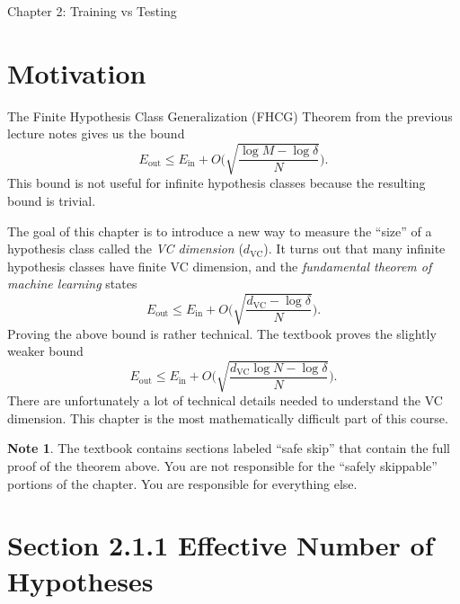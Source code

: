 \documentclass[10pt]{exam}
\theoremstyle{definition}
\newtheorem{note}{Note}
\newcommand{\Ein}{E_{\text{in}}}
\newcommand{\Eout}{E_{\text{out}}}
\newcommand{\dvc}{{d_{\text{VC}}}}
\begin{document}
\begin{center}
{
\Huge
Chapter 2: Training vs Testing
}
\end{center}

\begin{center}
\end{center}

\section*{Motivation}

The Finite Hypothesis Class Generalization (FHCG) Theorem from the previous lecture notes gives us the bound
\begin{equation}
    \Eout \le \Ein + O\bigg(\sqrt{\frac{\log M - \log\delta}{N}}\bigg)
    .
\end{equation}
This bound is not useful for infinite hypothesis classes because the resulting bound is trivial.

The goal of this chapter is to introduce a new way to measure the ``size'' of a hypothesis class called the \emph{VC dimension} ($\dvc$).
It turns out that many infinite hypothesis classes have finite VC dimension,
and the \emph{fundamental theorem of machine learning} states
\begin{equation}
    \Eout \le \Ein + O\bigg(\sqrt{\frac{\dvc - \log\delta}{N}}\bigg)
    .
\end{equation}
Proving the above bound is rather technical.
The textbook proves the slightly weaker bound
\begin{equation}
    \Eout \le \Ein + O\bigg(\sqrt{\frac{\dvc\log N - \log\delta}{N}}\bigg)
    .
\end{equation}
There are unfortunately a lot of technical details needed to understand the VC dimension.
This chapter is the most mathematically difficult part of this course.

\begin{note}
The textbook contains sections labeled ``safe skip'' that contain the full proof of the theorem above.
You are not responsible for the ``safely skippable'' portions of the chapter.
You are responsible for everything else.
\end{note}

\newpage
\section*{Section 2.1.1 Effective Number of Hypotheses}
\end{document}
